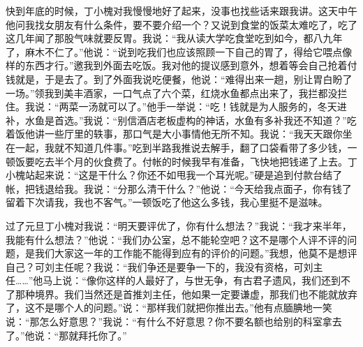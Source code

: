 \documentclass[12pt,oneside]{book}
\begin{document}
快到年底的时候，丁小槐对我慢慢地好了起来，没事也找些话来跟我讲。这天中午他问我找女朋友有什么条件，要不要介绍一个？又说到食堂的饭菜太难吃了，吃了这几年闻了那股气味就要反胃。我说：``我从读大学吃食堂吃到如今，都八九年了，麻木不仁了。''他说：``说到吃我们也应该照顾一下自己的胃了，得给它喂点像样的东西才行。''邀我到外面去吃饭。我对他的提议感到意外，想着等会自己抢着付钱就是，于是去了。到了外面我说吃便餐，他说：``难得出来一趟，别让胃白盼了一场。''领我到美丰酒家，一口气点了六个菜，红烧水鱼都点出来了，我拦都没拦住。我说：``两菜一汤就可以了。''他手一举说：``吃！钱就是为人服务的，冬天进补，水鱼是首选。''我说：``别信酒店老板虚构的神话，水鱼有多补我还不知道？''吃着饭他讲一些厅里的轶事，那口气是大小事情他无所不知。我说：``我天天跟你坐在一起，我就不知道几件事。''吃到半路我推说去解手，翻了口袋看带了多少钱，一顿饭要吃去半个月的伙食费了。付帐的时候我早有准备，飞快地把钱递了上去。丁小槐站起来说：``这是干什么？你还不如甩我一个耳光呢。''硬是追到付款台结了帐，把钱退给我。我说：``分那么清干什么？''他说：``今天给我点面子，你有钱了留着下次请我，我也不客气。''一顿饭吃了他这么多钱，我心里挺不是滋味。

过了元旦丁小槐对我说：``明天要评优了，你有什么想法？''我说：``我才来半年，我能有什么想法？''他说：``我们办公室，总不能轮空吧？这不是哪个人评不评的问题，是我们大家这一年的工作能不能得到应有的评价的问题。''我想，他莫不是想评自己？可刘主任呢？我说：``我们争还是要争一下的，我没有资格，可刘主任\ldots\ldots{}''他马上说：``像你这样的人最好了，与世无争，有古君子遗风，我们还到不了那种境界。我们当然还是首推刘主任，他如果一定要谦虚，那我们也不能就放弃了，这不是哪个人的问题。''说：``那样我们就把你推出去。''他有点腼腆地一笑说：``那怎么好意思？''我说：``有什么不好意思？你不要名额也给别的科室拿去了。''他说：``那就拜托你了。''
\end{document}

